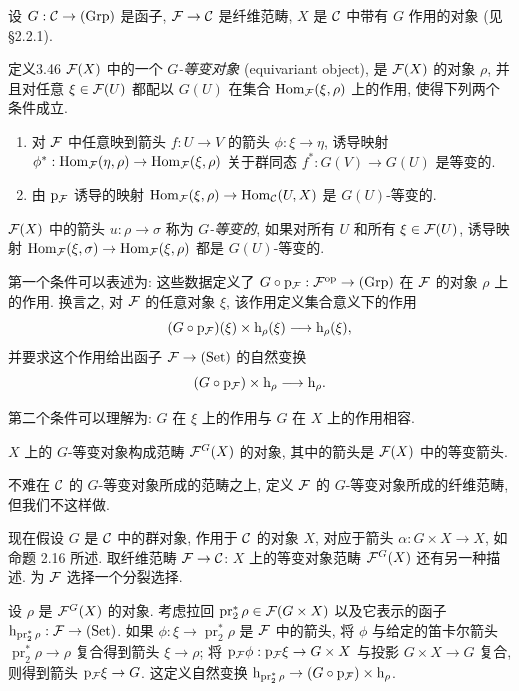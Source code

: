 设 $G:\mathcal C\to(\mathrm{Grp})$ 是函子, $\mathcal F\to\mathcal C$ 是纤维范畴, $X$ 是 $\mathcal C$ 中带有 $G$ 作用的对象 (见 \S2.2.1).

\begin{origstatement}{定义}{3.46}\label{ch03:def346}
$\mathcal F(X)$ 中的一个 \emph{$G$-等变对象} (equivariant object), 是 $\mathcal F(X)$ 的对象 $\rho$, 并且对任意 $\xi\in\mathcal F(U)$ 都配以 $G(U)$ 在集合 $\operatorname{Hom}_{\mathcal F}(\xi,\rho)$ 上的作用, 使得下列两个条件成立.
\begin{enumerate}
\item[(i)] 对 $\mathcal F$ 中任意映到箭头 $f:U\to V$ 的箭头 $\phi:\xi\to\eta$, 诱导映射 $\phi^*:\operatorname{Hom}_{\mathcal F}(\eta,\rho)\to\operatorname{Hom}_{\mathcal F}(\xi,\rho)$ 关于群同态 $f^*:G(V)\to G(U)$ 是等变的.
\item[(ii)] 由 $\mathrm p_{\mathcal F}$ 诱导的映射 $\operatorname{Hom}_{\mathcal F}(\xi,\rho)\to\operatorname{Hom}_{\mathcal C}(U,X)$ 是 $G(U)$-等变的.
\end{enumerate}
$\mathcal F(X)$ 中的箭头 $u:\rho\to\sigma$ 称为 \emph{$G$-等变的}, 如果对所有 $U$ 和所有 $\xi\in\mathcal F(U)$, 诱导映射 $\operatorname{Hom}_{\mathcal F}(\xi,\sigma)\to\operatorname{Hom}_{\mathcal F}(\xi,\rho)$ 都是 $G(U)$-等变的.
\end{origstatement}

第一个条件可以表述为: 这些数据定义了 $G\circ\mathrm p_{\mathcal F}:\mathcal F^{\mathrm{op}}\to(\mathrm{Grp})$ 在 $\mathcal F$ 的对象 $\rho$ 上的作用. 换言之, 对 $\mathcal F$ 的任意对象 $\xi$, 该作用定义集合意义下的作用
\[
(G\circ\mathrm p_{\mathcal F})(\xi)\times\mathrm h_\rho(\xi)\longrightarrow\mathrm h_\rho(\xi),
\]
并要求这个作用给出函子 $\mathcal F\to(\mathrm{Set})$ 的自然变换
\[
(G\circ\mathrm p_{\mathcal F})\times\mathrm h_\rho\longrightarrow\mathrm h_\rho.
\]

第二个条件可以理解为: $G$ 在 $\xi$ 上的作用与 $G$ 在 $X$ 上的作用相容.

$X$ 上的 $G$-等变对象构成范畴 $\mathcal F^G(X)$ 的对象, 其中的箭头是 $\mathcal F(X)$ 中的等变箭头.

不难在 $\mathcal C$ 的 $G$-等变对象所成的范畴之上, 定义 $\mathcal F$ 的 $G$-等变对象所成的纤维范畴, 但我们不这样做.

现在假设 $G$ 是 $\mathcal C$ 中的群对象, 作用于 $\mathcal C$ 的对象 $X$, 对应于箭头 $\alpha:G\times X\to X$, 如命题 2.16 所述. 取纤维范畴 $\mathcal F\to\mathcal C$: $X$ 上的等变对象范畴 $\mathcal F^G(X)$ 还有另一种描述. 为 $\mathcal F$ 选择一个分裂选择.

设 $\rho$ 是 $\mathcal F^G(X)$ 的对象. 考虑拉回 $\operatorname{pr}_2^*\rho\in\mathcal F(G\times X)$ 以及它表示的函子 $\mathrm h_{\operatorname{pr}_2^*\rho}:\mathcal F\to(\mathrm{Set})$. 如果 $\phi:\xi\to\operatorname{pr}_2^*\rho$ 是 $\mathcal F$ 中的箭头, 将 $\phi$ 与给定的笛卡尔箭头 $\operatorname{pr}_2^*\rho\to\rho$ 复合得到箭头 $\xi\to\rho$; 将 $\mathrm p_{\mathcal F}\phi:\mathrm p_{\mathcal F}\xi\to G\times X$ 与投影 $G\times X\to G$ 复合, 则得到箭头 $\mathrm p_{\mathcal F}\xi\to G$. 这定义自然变换 $\mathrm h_{\operatorname{pr}_2^*\rho}\to(G\circ\mathrm p_{\mathcal F})\times\mathrm h_\rho$.

